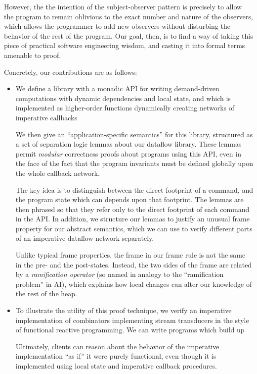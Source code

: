 \documentclass[preprint,natbib]{sigplanconf}
\begin{document}
However, the the intention of the subject-observer pattern is
precisely to allow the program to remain oblivious to the exact number
and nature of the observers, which allows the programmer to add new
observers without disturbing the behavior of the rest of the program.
Our goal, then, is to find a way of taking this piece of practical
software engineering wisdom, and casting it into formal terms amenable
to proof.

Concretely, our contributions are as follows: 

\begin{itemize}
  \item We define a library with a monadic API for writing
    demand-driven computations with dynamic dependencies and local
    state, and which is implemented as higher-order functions
    dynamically creating networks of imperative callbacks

    We then give an ``application-specific semantics'' for this
    library, structured as a set of separation logic lemmas about our
    dataflow library. These lemmas permit \emph{modular} correctness
    proofs about programs using this API, even in the face of the fact
    that the program invariants must be defined globally upon the
    whole callback network.

    The key idea is to distinguish between the direct footprint of a
    command, and the program state which can depends upon that
    footprint. The lemmas are then phrased so that they refer only to
    the direct footprint of each command in the API. In addition, we
    structure our lemmas to justify an unusual frame property for our
    abstract semantics, which we can use to verify different parts of
    an imperative dataflow network separately.

    Unlike typical frame properties, the frame in our frame rule is
    not the same in the pre- and the post-states. Instead, the two
    sides of the frame are related by a \emph{ramification operator}
    (so named in analogy to the ``ramification problem'' in AI), which
    explains how local changes can alter our knowledge of the rest of
    the heap.

  \item To illustrate the utility of this proof technique, we verify
    an imperative implementation of combinators implementing stream
    transducers in the style of functional reactive programming. We 
    can write programs which build up 

    Ultimately, clients can reason about the behavior of the imperative
    implementation ``as if'' it were purely functional, even though it
    is implemented using local state and imperative callback
    procedures.
\end{itemize}
\end{document}

